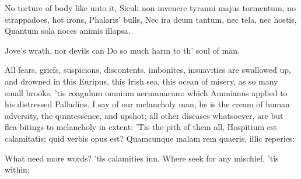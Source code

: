 No torture of body like unto it, Siculi non invenere tyranni majus
tormentum, no strappadoes, hot irons, Phalaris' bulls,
Nec ira deum tantum, nec tela, nec hostis,
Quantum sola noces animis illapsa.

Jove's wrath, nor devils can
Do so much harm to th' soul of man.

All fears, griefs, suspicions, discontents, imbonites, insuavities are
swallowed up, and drowned in this Euripus, this Irish sea, this ocean
of misery, as so many small brooks; 'tis coagulum omnium aerumnarum:
which Ammianus applied to his distressed Palladins. I say of our
melancholy man, he is the cream of human adversity, the 
quintessence, and upshot; all other diseases whatsoever, are but
flea-bitings to melancholy in extent: 'Tis the pith of them all, 
Hospitium est calamitatis; quid verbis opus est?
Quamcunque malam rem quaeris, illic reperies:

What need more words? 'tis calamities inn,
Where seek for any mischief, 'tis within;


